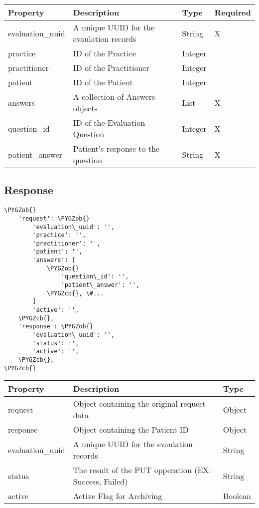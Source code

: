 \documentclass[letterpaper,10pt,english]{sphinxmanual}
\def\PYGZob{\char`\{}
\def\PYGZcb{\char`\}}
\begin{document}
\begin{tabulary}{\linewidth}{|L|L|L|L|}
\hline
\textsf{\relax 
Property
} & \textsf{\relax 
Description
} & \textsf{\relax 
Type
} & \textsf{\relax 
Required
}\\
\hline
evaluation\_uuid
 & 
A unique UUID for the evaulation
records
 & 
String
 & 
X
\\

practice
 & 
ID of the Practice
 & 
Integer
 & \\

practitioner
 & 
ID of the Practitioner
 & 
Integer
 & \\

patient
 & 
ID of the Patient
 & 
Integer
 & \\

answers
 & 
A collection of Answers objects
 & 
List
 & 
X
\\

question\_id
 & 
ID of the Evaluation Question
 & 
Integer
 & 
X
\\

patient\_answer
 & 
Patient's response to the question
 & 
String
 & 
X
\\
\hline\end{tabulary}



\subsection{Response}
\label{dev-api-evaluations:id3}
\begin{Verbatim}[commandchars=\\\{\}]
\PYGZob{}
    'request': \PYGZob{}
        'evaluation\_uuid': '',
        'practice': '',
        'practitioner': '',
        'patient': '',
        'answers': [
            \PYGZob{}
                'question\_id': '',
                'patient\_answer': '',
            \PYGZcb{}, \#...
        ]
        'active': '',
    \PYGZcb{},
    'response': \PYGZob{}
        'evaluation\_uuid': '',
        'status': '',
        'active': '',
    \PYGZcb{},
\PYGZcb{}
\end{Verbatim}

\begin{tabulary}{\linewidth}{|L|L|L|}
\hline
\textsf{\relax 
Property
} & \textsf{\relax 
Description
} & \textsf{\relax 
Type
}\\
\hline
request
 & 
Object containing the original
request data
 & 
Object
\\

response
 & 
Object containing the Patient ID
 & 
Object
\\

evaluation\_uuid
 & 
A unique UUID for the evaulation
records
 & 
String
\\

status
 & 
The result of the PUT opperation
(EX: Success, Failed)
 & 
String
\\

active
 & 
Active Flag for Archiving
 & 
Boolean
\\
\hline\end{tabulary}
\end{document}
